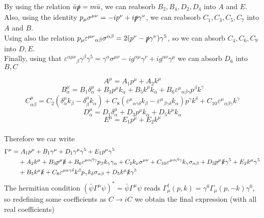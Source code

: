 \documentclass{article}
\newcommand{\s}[1]{\slashed #1}
\begin{document}
By using the relation $\bar{u}\s{p}= m\bar{u}$, we can reabsorb $B_2,B_4,D_2,D_4$ into $A$ and $E$. \\
Also, using the identity $p_\mu \sigma^{\mu\nu} = -i p^\nu +i \s{p}\gamma^\nu$, we can reabsorb $C_1, C_3, C_5, C_7$ into $A$ and $B$. \\
Using also the relation $p_\mu \varepsilon^{\mu\nu}{}_{\alpha\beta}\sigma^{\alpha\beta} = 2(p^\nu - \s{p}\gamma^\nu)\gamma^5$, so we can absorb $C_4, C_6, C_9$ into $D, E$. \\
Finally, using that $ \varepsilon^{\alpha\mu\nu}{}_{\beta}\gamma^\beta \gamma^5 = \gamma^\alpha \sigma^{\mu \nu} -ig^{\alpha\mu}\gamma^\nu+ig^{\alpha\nu}\gamma^\mu$ we can absorb $D_6$ into $B, C$

\begin{equation}
A^\mu = A_1 p^\mu + A_2 k^\mu
\end{equation}
\begin{equation}
B^\mu_\alpha = B_1\delta^\mu_\alpha + B_3 p^\mu k_\alpha + B_5 k^\mu k_\alpha + B_6 \varepsilon^\mu{}_{\alpha\beta\gamma}p^\beta k^\gamma
\end{equation}
\begin{equation}
C^\mu_{\alpha\beta} = C_2(\delta^\mu_\alpha k_\beta - \delta^\mu_\beta k_\alpha) + C_{8}(\varepsilon^\mu{}_{\alpha\gamma\delta}k_\beta - \varepsilon^\mu{}_{\beta\gamma\delta}k_\alpha) p^\gamma k^\delta + C_{10}\varepsilon^\mu{}_{\alpha\beta\gamma}k^\gamma
\end{equation}
\begin{equation}
D^\mu_\alpha = D_1\delta^\mu_\alpha + D_3 p^\mu k_\alpha + D_5 k^\mu k_\alpha
\end{equation}
\begin{equation}
E^\mu = E_1 p^\mu + E_2 k^\mu
\end{equation}
\\
Therefore we car write
\begin{align*}
	\Gamma^\mu =&\ A_1 p^\mu + B_1 \gamma^\mu + D_1 \gamma^\mu \gamma^5 + E_1 p^\mu \gamma^5\\&
	+ A_2 k^\mu + B_3 p^\mu\s{k} + B_6 \varepsilon^{\mu\alpha\beta\gamma}p_\beta k_\gamma \gamma_\alpha + C_2 k_\nu\sigma^{\mu\nu} + C_{10}\varepsilon^{\mu\alpha\beta\gamma}k_\gamma \sigma_{\alpha\beta} + D_3 p^\mu \s{k}\gamma^5 + E_2 k^\mu \gamma^5\\&
	+ B_5 k^\mu \s{k} + C_8 \varepsilon^{\mu\alpha\gamma\delta}k^\beta p_\gamma k_\delta\sigma_{\alpha\beta} + D_5 k^\mu \s{k}\gamma^5
\end{align*}
The hermitian condition $(\bar{\psi}\Gamma^\mu \psi)^* = \bar{\psi}\Gamma^\mu \psi$ reads $\Gamma_\mu ^\dag(p,k) = \gamma^0 \Gamma_\mu(p,-k) \gamma^0$, so redefining some coefficients as $C\to iC$ we obtain the final expression (with all real coefficients)
\end{document}
